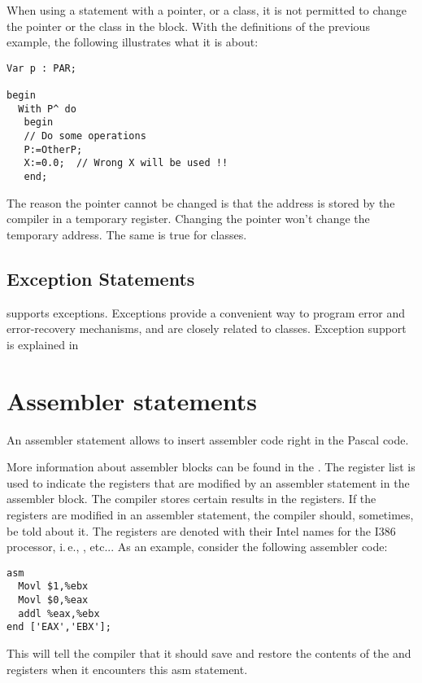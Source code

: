 \begin{remark}
When using a  statement with a pointer, or a class, it is not
permitted to change the pointer or the class in the  block.
With the definitions of the previous example, the following illustrates
what it is about:
\begin{verbatim}
Var p : PAR;

begin
  With P^ do
   begin
   // Do some operations
   P:=OtherP;
   X:=0.0;  // Wrong X will be used !!
   end;
\end{verbatim}
The reason the pointer cannot be changed is that the address is stored
by the compiler in a temporary register. Changing the pointer won't change
the temporary address. The same is true for classes.
\end{remark}

\subsection{Exception Statements}
\fpc supports exceptions. Exceptions provide a convenient way to
program error and error-recovery mechanisms, and are
closely related to classes.
Exception support is explained in 

\section{Assembler statements}
An assembler statement allows to insert assembler code right in the
Pascal code.

More information about assembler blocks can be found in the \progref.
The register list is used to indicate the registers that are modified by an
assembler statement in the assembler block. The compiler stores certain results in the
registers. If the registers are modified in an assembler statement, the compiler
should, sometimes, be told about it. The registers are denoted with their
Intel names for the I386 processor, i.\,e., ,  etc...
As an example, consider the following assembler code:
\begin{verbatim}
asm
  Movl $1,%ebx
  Movl $0,%eax
  addl %eax,%ebx
end ['EAX','EBX'];
\end{verbatim}
This will tell the compiler that it should save and restore the contents of
the  and  registers when it encounters this asm statement.

